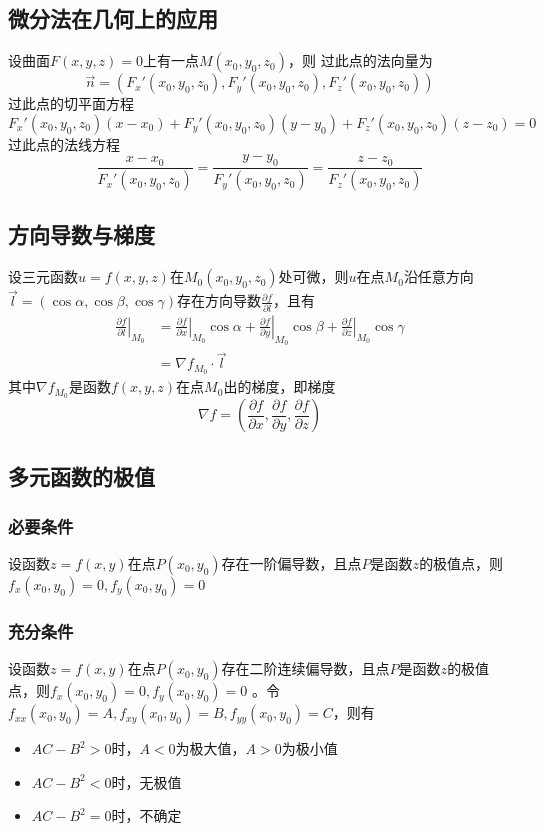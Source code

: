 \documentclass[a4paper,zihao=-4,UTF8]{ctexbook}
\begin{document}
\subsection{微分法在几何上的应用}
设曲面$F(x,y,z)=0$上有一点$M(x_0,y_0,z_0)$，则
过此点的法向量为
\[
\vec{n}=\left(F_{x}'\left(x_{0}, y_{0}, z_{0}\right), F_{y}'\left(x_{0}, y_{0}, z_{0}\right), F_{z}'\left(x_{0}, y_{0}, z_{0}\right)\right)
\]
过此点的切平面方程
\[
F_{x}'\left(x_{0}, y_{0}, z_{0}\right)\left(x-x_{0}\right)+F_{y}'\left(x_{0}, y_{0}, z_{0}\right)\left(y-y_{0}\right)+F_{z}'\left(x_{0}, y_{0}, z_{0}\right)\left(z-z_{0}\right)=0
\]
过此点的法线方程
\[
\frac{x-x_{0}}{F_x'\left(x_{0}, y_{0}, z_{0}\right)}=\frac{y-y_{0}}{F_{y}'\left(x_{0}, y_{0}, z_{0}\right)}=\frac{z-z_{0}}{F_{z}'\left(x_{0}, y_{0}, z_{0}\right)}
\]
\subsection{方向导数与梯度}
设三元函数$u=f(x,y,z)$在$M_0(x_0,y_0,z_0)$处可微，则$u$在点$M_0$沿任意方向$\vec{l}=(\cos\alpha,\cos\beta,\cos\gamma)$存在方向导数$\frac{\partial f}{\partial l}$，且有
\begin{align*}
    \left.\frac{\partial f}{\partial l}\right|_{M_0}&=
\left.\frac{\partial f}{\partial x}\right|_{M_0}\cos\alpha+
\left.\frac{\partial f}{\partial y}\right|_{M_0}\cos\beta+
\left.\frac{\partial f}{\partial z}\right|_{M_0}\cos\gamma\\
&=\nabla f_{M_0}\cdot\vec{l}
\end{align*}
其中$\nabla f_{M_0}$是函数$f(x,y,z)$在点$M_0$出的梯度，即梯度
\[\nabla f=\left(\frac{\partial f}{\partial x},\frac{\partial f}{\partial y},\frac{\partial f}{\partial z}\right)\]
\subsection{多元函数的极值}
\subsubsection{必要条件}
设函数$z=f(x,y)$在点$P(x_0,y_0)$存在一阶偏导数，且点$P$是函数$z$的极值点，则$f_x(x_0,y_0)=0,f_y(x_0,y_0)=0$
\subsubsection{充分条件} 
设函数$z=f(x,y)$在点$P(x_0,y_0)$存在二阶连续偏导数，且点$P$是函数$z$的极值点，则$f_x(x_0,y_0)=0,f_y(x_0,y_0)=0$ 。令$f_{xx}(x_0,y_0)=A,f_{xy}(x_0,y_0)=B,f_{yy}(x_0,y_0)=C$，则有
\begin{itemize}[nosep,left=\parindent,align=left]
    \item $AC-B^2>0$时，$A<0$为极大值，$A>0$为极小值
    \item $AC-B^2<0$时，无极值
    \item $AC-B^2=0$时，不确定
\end{itemize}
\end{document}
